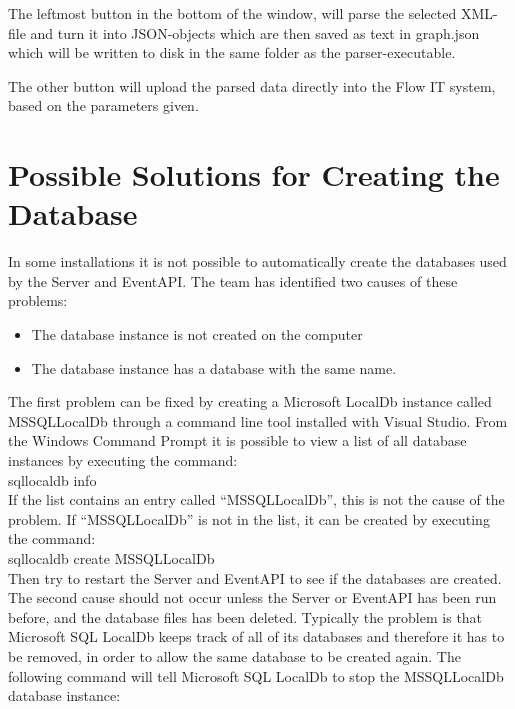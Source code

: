 The leftmost button in the bottom of the window, will parse the selected XML-file and turn it into JSON-objects which are then saved as text in graph.json which will be written to disk in the same folder as the parser-executable.

The other button will upload the parsed data directly into the Flow IT system, based on the parameters given.



\section{Possible Solutions for Creating the Database \label{sec:SolutionsForCreatingTheDatabaseAppendix}}
In some installations it is not possible to automatically create the databases used by the Server and EventAPI. The team has identified two causes of these problems:
\begin{itemize}
\item The database instance is not created on the computer
\item The database instance has a database with the same name.
\end{itemize}


The first problem can be fixed by creating a Microsoft LocalDb instance called MSSQLLocalDb through a command line tool installed with Visual Studio.
From the Windows Command Prompt it is possible to view a list of all database instances by executing the command:\\

\indent	sqllocaldb info\\

If the list contains an entry called “MSSQLLocalDb”, this is not the cause of the problem. If “MSSQLLocalDb” is not in the list, it can be created by executing the command:\\

\indent	sqllocaldb create MSSQLLocalDb\\

Then try to restart the Server and EventAPI to see if the databases are created.\\



The second cause should not occur unless the Server or EventAPI has been run before, and the database files has been deleted. Typically the problem is that Microsoft SQL LocalDb keeps track of all of its databases and therefore it has to be removed, in order to allow the same database to be created again. The following command will tell Microsoft SQL LocalDb to stop the MSSQLLocalDb database instance:\\

